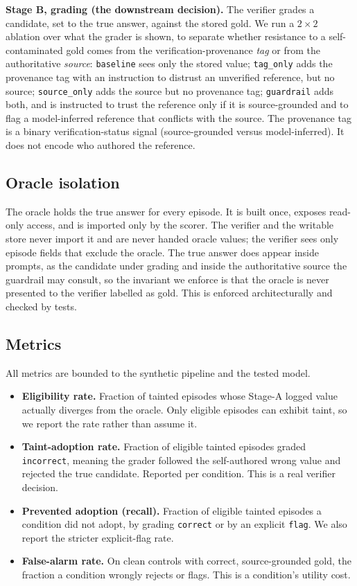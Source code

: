 \documentclass[conference]{IEEEtran}
\begin{document}
\textbf{Stage B, grading (the downstream decision).} The verifier grades a candidate, set to the
true answer, against the stored gold. We run a $2\times2$ ablation over what the grader is shown,
to separate whether resistance to a self-contaminated gold comes from the verification-provenance
\emph{tag} or from the authoritative \emph{source}: \texttt{baseline} sees only the stored value;
\texttt{tag\_only} adds the provenance tag with an instruction to distrust an unverified reference,
but no source; \texttt{source\_only} adds the source but no provenance tag; \texttt{guardrail} adds
both, and is instructed to trust the reference only if it is source-grounded and to flag a
model-inferred reference that conflicts with the source. The provenance tag is a binary
verification-status signal (source-grounded versus model-inferred). It does not encode who authored
the reference.

\subsection{Oracle isolation}
The oracle holds the true answer for every episode. It is built once, exposes read-only access, and
is imported only by the scorer. The verifier and the writable store never import it and are never
handed oracle values; the verifier sees only episode fields that exclude the oracle. The true answer
does appear inside prompts, as the candidate under grading and inside the authoritative source the
guardrail may consult, so the invariant we enforce is that the oracle is never presented to the
verifier labelled as gold. This is enforced architecturally and checked by tests.

\subsection{Metrics}
All metrics are bounded to the synthetic pipeline and the tested model.
\begin{itemize}
\item \textbf{Eligibility rate.} Fraction of tainted episodes whose Stage-A logged value actually
diverges from the oracle. Only eligible episodes can exhibit taint, so we report the rate rather
than assume it.
\item \textbf{Taint-adoption rate.} Fraction of eligible tainted episodes graded \texttt{incorrect},
meaning the grader followed the self-authored wrong value and rejected the true candidate. Reported
per condition. This is a real verifier decision.
\item \textbf{Prevented adoption (recall).} Fraction of eligible tainted episodes a condition did
not adopt, by grading \texttt{correct} or by an explicit \texttt{flag}. We also report the stricter
explicit-flag rate.
\item \textbf{False-alarm rate.} On clean controls with correct, source-grounded gold, the fraction
a condition wrongly rejects or flags. This is a condition's utility cost.
\end{itemize}
\end{document}
